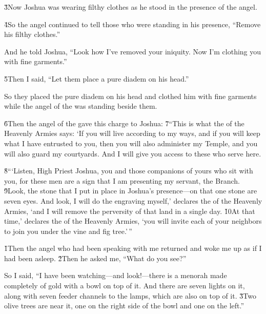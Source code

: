 \v{3}Now Joshua was wearing filthy clothes as he stood in the presence of the angel.

\v{4}So the angel continued to tell those who were standing in his presence, ``Remove his filthy clothes.''

And he told Joshua, ``Look how I've removed your iniquity. Now I'm clothing you with fine garments.''

\v{5}Then I said, ``Let them place a pure diadem on his head.''

So they placed the pure diadem on his head and clothed him with fine garments while the angel of the  was standing beside them.

\v{6}Then the angel of the  gave this charge to Joshua: \v{7}``This is what the  of the Heavenly Armies says: `If you will live according to my ways, and if you will keep what I have entrusted to you, then you will also administer my Temple, and you will also guard my courtyards. And I will give you access to these who serve here.

\v{8}```Listen, High Priest Joshua, you and those companions of yours who sit with you, for these men are a sign that I am presenting my servant, the Branch. \v{9}Look, the stone that I put in place in Joshua's presence---on that one stone are seven eyes. And look, I will do the engraving myself,' declares the  of the Heavenly Armies, `and I will remove the perversity of that land in a single day. \v{10}At that time,' declares the  of the Heavenly Armies, `you will invite each of your neighbors to join you under the vine and fig tree.'\,''

\v{1}Then the angel who had been speaking with me returned and woke me up as if I had been asleep. \v{2}Then he asked me, ``What do you see?''

So I said, ``I have been watching---and look!---there is a menorah made completely of gold with a bowl on top of it. And there are seven lights on it, along with seven feeder channels to the lamps, which are also on top of it. \v{3}Two olive trees are near it, one on the right side of the bowl and one on the left.''


